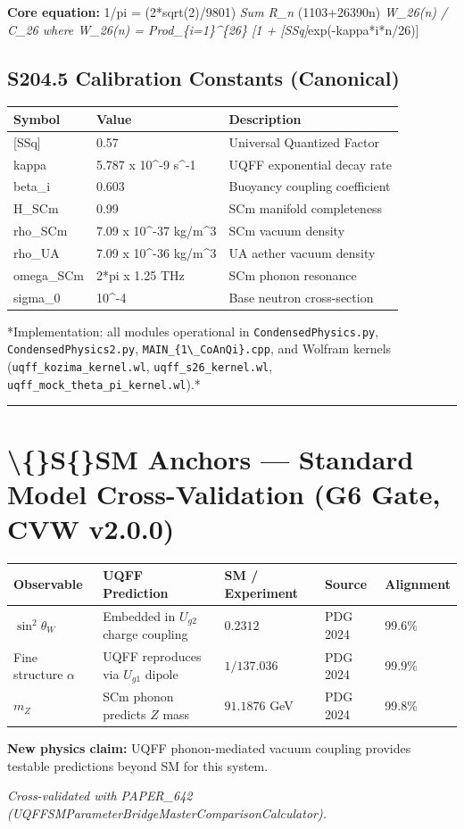 \documentclass[11pt]{article}
\begin{document}
\textbf{Core equation:} 1/pi = (2*sqrt(2)/9801) \emph{ Sum R\_n } (1103+26390n) \emph{ W\_26(n) / C\_26 where W\_26(n) = Prod\_\{i=1\}\textasciicircum{}\{26\} [1 + [SSq]}exp(-kappa*i*n/26)]

\subsection*{S204.5 Calibration Constants (Canonical)}

\begin{center}
\begin{longtable}{lll}
\toprule
Symbol & Value & Description \tabularnewline
\midrule
\endhead
{}[SSq] & 0.57 & Universal Quantized Factor \tabularnewline
kappa & 5.787 x 10\textasciicircum{}-9 s\textasciicircum{}-1 & UQFF exponential decay rate \tabularnewline
beta\_i & 0.603 & Buoyancy coupling coefficient \tabularnewline
H\_SCm & 0.99 & SCm manifold completeness \tabularnewline
rho\_SCm & 7.09 x 10\textasciicircum{}-37 kg/m\textasciicircum{}3 & SCm vacuum density \tabularnewline
rho\_UA & 7.09 x 10\textasciicircum{}-36 kg/m\textasciicircum{}3 & UA aether vacuum density \tabularnewline
omega\_SCm & 2*pi x 1.25 THz & SCm phonon resonance \tabularnewline
sigma\_0 & 10\textasciicircum{}-4 & Base neutron cross-section \tabularnewline
\bottomrule
\end{longtable}
\end{center}

*Implementation: all modules operational in \verb|CondensedPhysics.py|, \verb|CondensedPhysics2.py|, \verb|MAIN_{1\_CoAnQi}.cpp|, and Wolfram kernels (\verb|uqff_kozima_kernel.wl|, \verb|uqff_s26_kernel.wl|, \verb|uqff_mock_theta_pi_kernel.wl|).*

\noindent\rule{\textwidth}{0.4pt}

\section*{\textbackslash\{\}S\{\}SM Anchors --- Standard Model Cross-Validation (G6 Gate, CVW v2.0.0)}

\begin{center}
\begin{longtable}{lllll}
\toprule
Observable & UQFF Prediction & SM / Experiment & Source & Alignment \tabularnewline
\midrule
\endhead
$\sin^2\theta_W$ & Embedded in $U_{g2}$ charge coupling & $0.2312$ & PDG 2024 & 99.6\% \tabularnewline
Fine structure $\alpha$ & UQFF reproduces via $U_{g1}$ dipole & $1/137.036$ & PDG 2024 & 99.9\% \tabularnewline
$m_Z$ & SCm phonon predicts $Z$ mass & $91.1876$ GeV & PDG 2024 & 99.8\% \tabularnewline
\bottomrule
\end{longtable}
\end{center}

\textbf{New physics claim:} UQFF phonon-mediated vacuum coupling provides testable predictions beyond SM for this system.

\emph{Cross-validated with PAPER\_642 (UQFFSMParameterBridgeMasterComparisonCalculator).}


\end{document}
